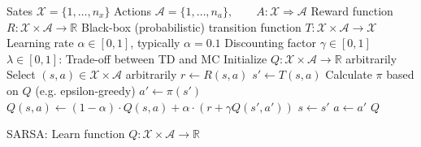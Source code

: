\documentclass{article}
\begin{document}
\begin{preview}
    \begin{algorithm}[H]
        \begin{algorithmic}
        \Require
        \Statex Sates $\mathcal{X} = \{1, \dots, n_x\}$
        \Statex Actions $\mathcal{A} = \{1, \dots, n_a\},\qquad A: \mathcal{X} \Rightarrow \mathcal{A}$
        \Statex Reward function $R: \mathcal{X} \times \mathcal{A} \rightarrow \mathbb{R}$
        \Statex Black-box (probabilistic) transition function $T: \mathcal{X} \times \mathcal{A} \rightarrow \mathcal{X}$
        \Statex Learning rate $\alpha \in [0, 1]$, typically $\alpha = 0.1$
        \Statex Discounting factor $\gamma \in [0, 1]$
        \Statex $\lambda \in [0, 1]$: Trade-off between TD and MC
            \State Initialize $Q: \mathcal{X} \times \mathcal{A} \rightarrow \mathbb{R}$ arbitrarily
                \State Select $(s, a) \in \mathcal{X} \times \mathcal{A}$ arbitrarily
                    \State $r \gets R(s, a)$ 
                    \State $s' \gets T(s, a)$ 
                    \State Calculate $\pi$ based on $Q$ (e.g. epsilon-greedy)
                    \State $a' \gets \pi(s')$
                    \State $Q(s, a) \gets (1 - \alpha ) \cdot Q(s, a) + \alpha \cdot (r + \gamma Q(s', a'))$
                    \State $s \gets s'$
                    \State $a \gets a'$
                \EndWhile
            \EndWhile
            \Return $Q$
        \EndProcedure
        \end{algorithmic}
    \caption{SARSA: Learn function $Q: \mathcal{X} \times \mathcal{A} \rightarrow \mathbb{R}$}
    \label{alg:sarsa}
    \end{algorithm}
\end{preview}
\end{document}
